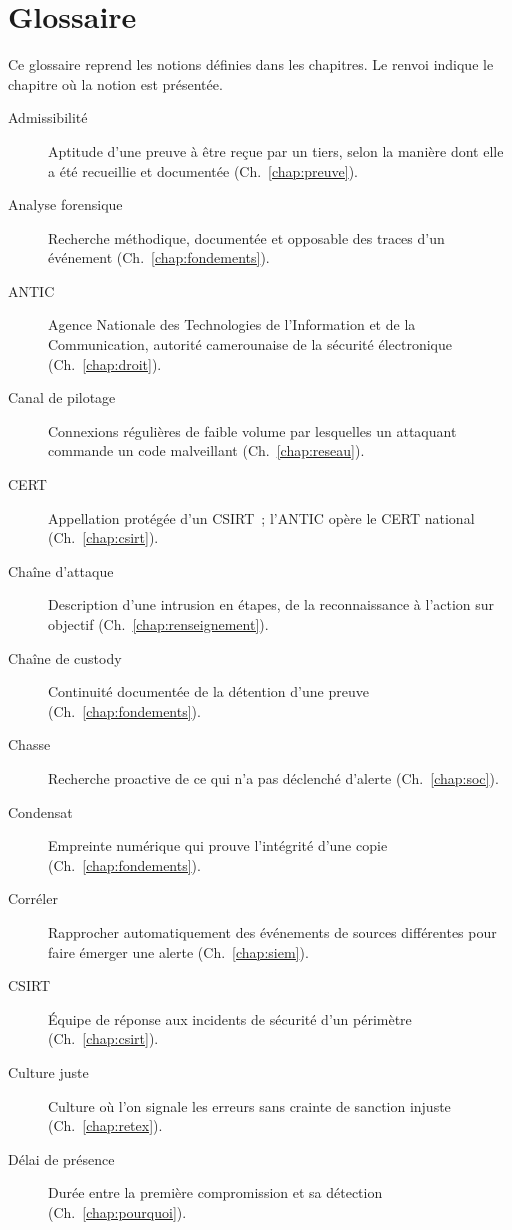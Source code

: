 \chapter{Glossaire}
\label{ann:glossaire}

Ce glossaire reprend les notions définies dans les chapitres. Le renvoi
indique le chapitre où la notion est présentée.

\begin{description}
    \item[Admissibilité] Aptitude d'une preuve à être reçue par un tiers, selon la manière dont elle a été recueillie et documentée (Ch.~\ref{chap:preuve}).
    \item[Analyse forensique] Recherche méthodique, documentée et opposable des traces d'un événement (Ch.~\ref{chap:fondements}).
    \item[ANTIC] Agence Nationale des Technologies de l'Information et de la Communication, autorité camerounaise de la sécurité électronique (Ch.~\ref{chap:droit}).
    \item[Canal de pilotage] Connexions régulières de faible volume par lesquelles un attaquant commande un code malveillant (Ch.~\ref{chap:reseau}).
    \item[CERT] Appellation protégée d'un CSIRT~; l'ANTIC opère le CERT national (Ch.~\ref{chap:csirt}).
    \item[Chaîne d'attaque] Description d'une intrusion en étapes, de la reconnaissance à l'action sur objectif (Ch.~\ref{chap:renseignement}).
    \item[Chaîne de custody] Continuité documentée de la détention d'une preuve (Ch.~\ref{chap:fondements}).
    \item[Chasse] Recherche proactive de ce qui n'a pas déclenché d'alerte (Ch.~\ref{chap:soc}).
    \item[Condensat] Empreinte numérique qui prouve l'intégrité d'une copie (Ch.~\ref{chap:fondements}).
    \item[Corréler] Rapprocher automatiquement des événements de sources différentes pour faire émerger une alerte (Ch.~\ref{chap:siem}).
    \item[CSIRT] Équipe de réponse aux incidents de sécurité d'un périmètre (Ch.~\ref{chap:csirt}).
    \item[Culture juste] Culture où l'on signale les erreurs sans crainte de sanction injuste (Ch.~\ref{chap:retex}).
    \item[Délai de présence] Durée entre la première compromission et sa détection (Ch.~\ref{chap:pourquoi}).

\end{description}

